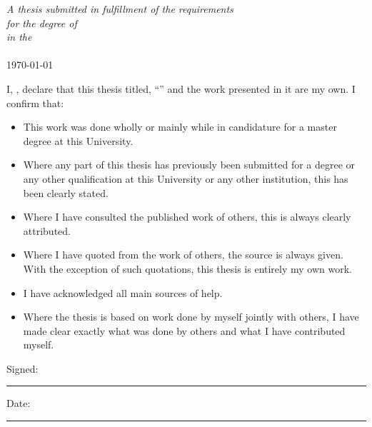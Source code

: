 \documentclass[
11pt, %
english, %
singlespacing, %
headsepline, %
]{MastersDoctoralThesis} %
\begin{document}
\begin{titlepage}
\begin{center}
\vfill

\large \textit{A thesis submitted in fulfillment of the requirements\\ for the degree of \degreename}\\[0.3cm] %
\textit{in the}\\[0.4cm]
\facname\\[2cm] %
 
\vfill
{\large \today}\\[4cm] %


\vfill
\end{center}
\end{titlepage}


\begin{declaration}
\addchaptertocentry{\authorshipname} %
\noindent I, \authorname, declare that this thesis titled, \enquote{\ttitle} and the work presented in it are my own. I confirm that:

\begin{itemize} 
\item This work was done wholly or mainly while in candidature for a master degree at this University.
\item Where any part of this thesis has previously been submitted for a degree or any other qualification at this University or any other institution, this has been clearly stated.
\item Where I have consulted the published work of others, this is always clearly attributed.
\item Where I have quoted from the work of others, the source is always given. With the exception of such quotations, this thesis is entirely my own work.
\item I have acknowledged all main sources of help.
\item Where the thesis is based on work done by myself jointly with others, I have made clear exactly what was done by others and what I have contributed myself.
\end{itemize}
 
\noindent Signed:\\
\rule[0.5em]{25em}{0.5pt} %
 
\noindent Date:\\
\rule[0.5em]{25em}{0.5pt} %
\end{declaration}
\end{document}
